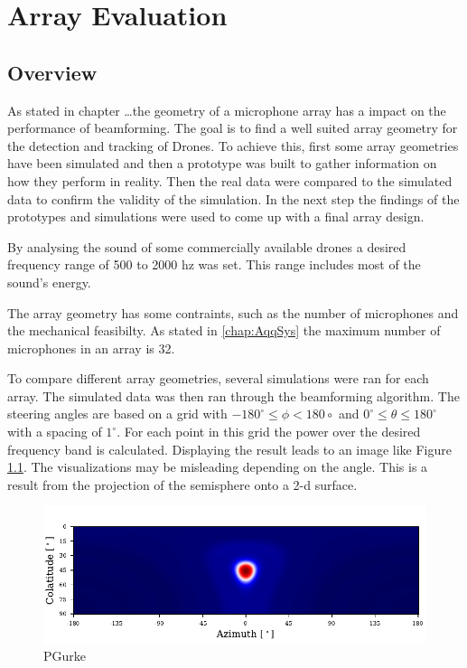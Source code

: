 \chapter{Array Evaluation}
\section{Overview}
As stated in chapter \dots the geometry of a microphone array
has a impact on the performance of beamforming.
The goal is to find a well suited array geometry for the detection and tracking of
Drones.
To achieve this, first some array geometries have been simulated and then
a prototype was built to gather information on how they perform in reality.
Then the real data were compared to the simulated data to
confirm the validity of the simulation.
In the next step the findings of the prototypes and simulations
were used to come up with a final array design.

By analysing the sound of some commercially available drones
a desired frequency range of 500 to 2000 hz was set.
This range includes most of the sound's energy.

The array geometry has some contraints,
such as the number of microphones and the mechanical feasibilty.
As stated in \ref*{chap:AqqSys} the maximum number of microphones
in an array is 32.

To compare different array geometries, several simulations
were ran for each array.
The simulated data was then ran through the beamforming
algorithm.
The steering angles are based on a grid with $-180^\circ \leq \phi < 180\circ$ and
$0^\circ \leq \theta \leq 180^\circ$ with a spacing of $1^\circ$.
For each point in this grid the power over the desired frequency band is calculated.
Displaying the result leads to an image like Figure \ref*{aev:fig:gridEx}.
The visualizations may be misleading depending on the angle.
This is a result from the projection of the semisphere onto a 2-d surface.
\begin{figure}
	\centering
	\includegraphics[]{images/5_array_evaluation/0.5_0.79.pdf}
	\caption{PGurke}
	\label{aev:fig:gridEx}
\end{figure}
